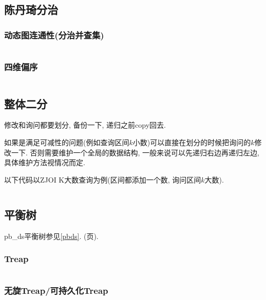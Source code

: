 \documentclass[a4paper, twoside]{article}
\begin{document}
\begin{multicols}{2}
					
	
			\subsection{陈丹琦分治}
				\subsubsection{动态图连通性(分治并查集)}
					\inputminted{cpp}{../src/datastructure/分治并查集.cpp}

				\subsubsection{四维偏序}
					\inputminted{cpp}{../src/datastructure/CDQ分治.cpp}
	
			\subsection{整体二分}
				修改和询问都要划分, 备份一下, 递归之前copy回去.

				如果是满足可减性的问题(例如查询区间$k$小数)可以直接在划分的时候把询问的$k$修改一下. 否则需要维护一个全局的数据结构, 一般来说可以先递归右边再递归左边, 具体维护方法视情况而定.

				以下代码以ZJOI K大数查询为例(区间都添加一个数, 询问区间$k$大数).

				\inputminted{cpp}{../src/datastructure/整体二分.cpp}

	
	
			\subsection{平衡树}
				pb\_ds平衡树参见\ref{pbds}. (\pageref{pbds}页).

				\subsubsection{Treap}
					\inputminted{cpp}{../src/datastructure/Treap.cpp}
					
				\subsubsection{无旋Treap/可持久化Treap}
					\inputminted{cpp}{../src/datastructure/无旋Treap.cpp}
		

\end{multicols}
\end{document}
